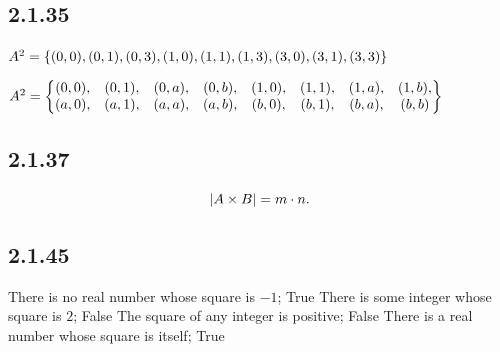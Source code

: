 \documentclass[12pt,titlepage]{extarticle}
\begin{document}
\subsection*{2.1.35}
\begin{tasks}
    \task $A^2 = \qty{
        (0, 0),
        (0, 1),
        (0, 3),
        (1, 0),
        (1, 1),
        (1, 3),
        (3, 0),
        (3, 1),
        (3, 3)
    }$

    \task $A^2 = \qty{\mqty{
        (0, 0), &
        (0, 1), &
        (0, a), &
        (0, b), &
        (1, 0), &
        (1, 1), &
        (1, a), &
        (1, b), \\
        (a, 0), &
        (a, 1), &
        (a, a), &
        (a, b), &
        (b, 0), &
        (b, 1), &
        (b, a), &
        (b, b)
    }}$
\end{tasks}

\subsection*{2.1.37}
\[
    \qty|A \times B| = m \cdot n
.\]

\subsection*{2.1.45}
\begin{tasks}
    \task There is no real number whose square is $-1$; True
    \task There is some integer whose square is $2$; False
    \task The square of any integer is positive; False
    \task There is a real number whose square is itself; True
\end{tasks}
\end{document}
